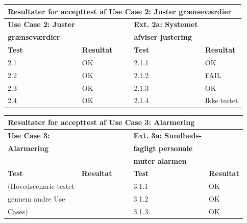 \begin{table}[h!]
	\centering
	\begin{tabular}{llllll}
		\multicolumn{6}{l}{\cellcolor[HTML]{187ABD}\textbf{Resultater for accepttest af Use Case 2: Juster grænseværdier}} \\ \hline
		\textbf{Use Case 2: Juster} & \multicolumn{1}{l|}{} &  & \multicolumn{1}{l|}{} & \textbf{Ext. 2a: Systemet} &  \\
		\textbf{grænseværdier} & \multicolumn{1}{l|}{} &  & \multicolumn{1}{l|}{} & \textbf{afviser justering} &  \\ \cline{1-2} \cline{5-6} 
		\textbf{Test} & \multicolumn{1}{l|}{\textbf{Resultat}} &  & \multicolumn{1}{l|}{} & \textbf{Test} & \textbf{Resultat} \\ \cline{1-2} \cline{5-6} 
		2.1 & \multicolumn{1}{l|}{OK} &  & \multicolumn{1}{l|}{} & 2.1.1 & OK \\ \cline{1-2} \cline{5-6} 
		2.2 & \multicolumn{1}{l|}{OK} &  & \multicolumn{1}{l|}{} & 2.1.2 & FAIL \\ \cline{1-2} \cline{5-6} 
		2.3 & \multicolumn{1}{l|}{OK} &  & \multicolumn{1}{l|}{} & 2.1.3 & OK \\ \cline{1-2} \cline{5-6} 
		2.4 & \multicolumn{1}{l|}{OK} &  & \multicolumn{1}{l|}{} & 2.1.4 & Ikke testet
	\end{tabular}
\end{table}

\begin{table}[h!]
	\centering
	\begin{tabular}{llllll}
		\multicolumn{6}{l}{\cellcolor[HTML]{187ABD}\textbf{Resultater for accepttest af Use Case 3: Alarmering}} \\ \hline
		\textbf{Use Case 3:} & \multicolumn{1}{l|}{} &  & \multicolumn{1}{l|}{} & \textbf{Ext. 3a: Sundheds-} &  \\
		\textbf{Alarmering} & \multicolumn{1}{l|}{} &  & \multicolumn{1}{l|}{} & \textbf{fagligt personale} &  \\
		& \multicolumn{1}{l|}{} &  & \multicolumn{1}{l|}{} & \textbf{muter alarmen} &  \\ \cline{1-2} \cline{5-6} 
		\textbf{Test} & \multicolumn{1}{l|}{\textbf{Resultat}} &  & \multicolumn{1}{l|}{} & \textbf{Test} & \textbf{Resultat} \\ \cline{1-2} \cline{5-6} 
		(Hovedscenarie testet & \multicolumn{1}{l|}{} &  & \multicolumn{1}{l|}{} & 3.1.1 & OK \\ \cline{5-6} 
		gennem andre Use & \multicolumn{1}{l|}{} &  & \multicolumn{1}{l|}{} & 3.1.2 & OK \\ \cline{5-6} 
		Cases) & \multicolumn{1}{l|}{} &  & \multicolumn{1}{l|}{} & 3.1.3 & OK
	\end{tabular}
\end{table}


